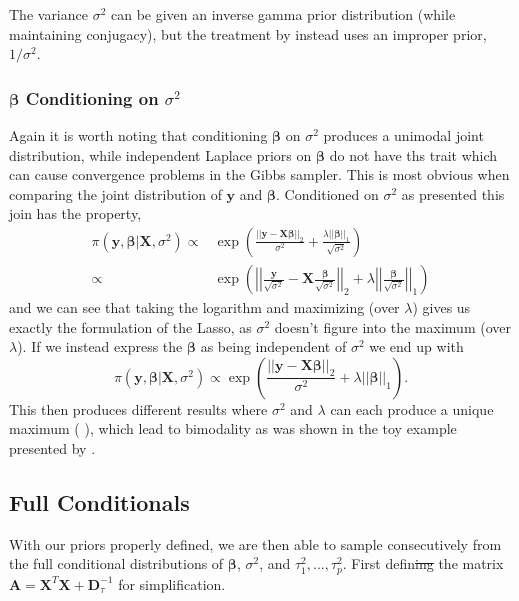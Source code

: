 \documentclass{uwstat572}
\newcommand{\vmdel}[1]{\sout{#1}}
\newcommand{\vmadd}[1]{\textbf{\color{red}{#1}}}
\newcommand{\vmcomment}[1]{({\color{blue}{VM's comment:}} \textbf{\color{blue}{#1}})}
\begin{document}
The variance $\sigma^2$ can be given an inverse gamma prior distribution (while maintaining conjugacy), but the treatment by \cite{park2008bayesian} instead uses an improper prior, $1/\sigma^2$. 



\subsubsection{$\boldsymbol\beta$ Conditioning on $\sigma^2$}\label{unimodal}
Again it is worth noting that conditioning $\boldsymbol\beta$ on $\sigma^2$ produces a unimodal joint distribution, while independent Laplace priors on $\boldsymbol\beta$ do not have ths trait which can cause convergence problems in the Gibbs sampler. This is most obvious when comparing the joint distribution of $\mathbf{y}$ and $\boldsymbol\beta$. Conditioned on $\sigma^2$ as presented this join has the property, 
\begin{align*}
\pi(\mathbf{y},\boldsymbol\beta|\mathbf{X},\sigma^2) \propto& \exp{\left(\frac{||\mathbf{y}-\mathbf{X}\boldsymbol\beta||_2}{\sigma^2}+\frac{\lambda ||\boldsymbol\beta||_1}{\sqrt{\sigma^2}}\right)}\\
\propto& \exp{\left(\left|\left|\frac{\mathbf{y}}{\sqrt{\sigma^2}}-\mathbf{X}\frac{\boldsymbol\beta}{\sqrt{\sigma^2}}\right|\right|_2+\lambda \left|\left|\frac{\boldsymbol\beta}{\sqrt{\sigma^2}}\right|\right|_1\right)}
\end{align*}
and we can see that taking the logarithm and maximizing (over $\lambda$) gives us exactly the formulation of the Lasso, as $\sigma^2$ doesn't figure into the maximum (over $\lambda$). If we instead express the $\boldsymbol\beta$ as being independent of $\sigma^2$ we end up with \[
\pi(\mathbf{y},\boldsymbol\beta|\mathbf{X},\sigma^2) \propto \exp{\left(\frac{||\mathbf{y}-\mathbf{X}\boldsymbol\beta||_2}{\sigma^2}+\lambda ||\boldsymbol\beta||_1\right)}.
\] This then produces different results where $\sigma^2$ and $\lambda$ can each produce a unique maximum \vmcomment{When you maximize over what? Sorry, I am still not getting it.}, which lead to bimodality as was shown in the toy example presented by \cite{park2008bayesian}.

\subsection{Full Conditionals}
With our priors properly defined, we are then able to sample consecutively from the full conditional distributions of $\boldsymbol\beta$, $\sigma^2$, and $\tau^2_1,...,\tau^2_p$. First\vmadd{,} defin\vmadd{e}\vmdel{ing} the matrix $\mathbf{A}=\mathbf{X}^T\mathbf{X}+\mathbf{D}_\tau^{-1}$ for simplification.
\end{document}
